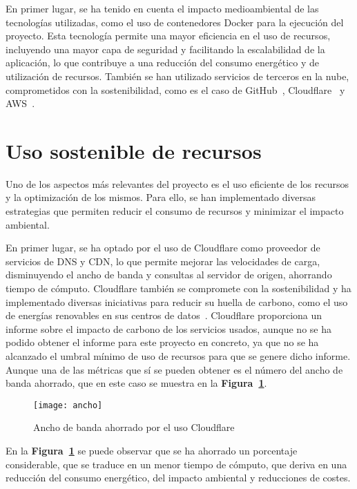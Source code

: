 En primer lugar, se ha tenido en cuenta el impacto medioambiental de las tecnologías utilizadas, como el uso de contenedores Docker para la ejecución del proyecto. Esta tecnología permite una mayor eficiencia en el uso de recursos, incluyendo una mayor capa de seguridad y facilitando la escalabilidad de la aplicación, lo que contribuye a una reducción del consumo energético y de utilización de recursos. También se han utilizado servicios de terceros en la nube, comprometidos con la sostenibilidad, como es el caso de GitHub~\cite{SosGithub}, Cloudflare~\cite{SosCloudflare} y AWS~\cite{SosAWS}.

\section{Uso sostenible de recursos}

Uno de los aspectos más relevantes del proyecto es el uso eficiente de los recursos y la optimización de los mismos. Para ello, se han implementado diversas estrategias que permiten reducir el consumo de recursos y minimizar el impacto ambiental.

En primer lugar, se ha optado por el uso de Cloudflare como proveedor de servicios de DNS y CDN, lo que permite mejorar las velocidades de carga, disminuyendo el ancho de banda y consultas al servidor de origen, ahorrando tiempo de cómputo. Cloudflare también se compromete con la sostenibilidad y ha implementado diversas iniciativas para reducir su huella de carbono, como el uso de energías renovables en sus centros de datos~\cite{SosCloudflare}. Cloudflare proporciona un informe sobre el impacto de carbono de los servicios usados, aunque no se ha podido obtener el informe para este proyecto en concreto, ya que no se ha alcanzado el umbral mínimo de uso de recursos para que se genere dicho informe. Aunque una de las métricas que sí se pueden obtener es el número del ancho de banda ahorrado, que en este caso se muestra en la \textbf{Figura~\ref{fig:ancho}}.

\begin{figure}[!h]
    \centering
    \texttt{[image: ancho]}
    \caption{Ancho de banda ahorrado por el uso Cloudflare}\label{fig:ancho}
\end{figure}
\FloatBarrier

En la \textbf{Figura~\ref{fig:ancho}} se puede observar que se ha ahorrado un porcentaje considerable, que se traduce en un menor tiempo de cómputo, que deriva en una reducción del consumo energético, del impacto ambiental y reducciones de costes.

